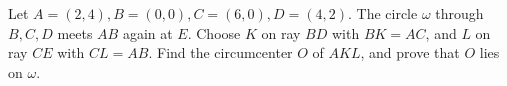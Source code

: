 Let $A=(2,4),B=(0,0),C=(6,0),D=(4,2)$. The circle $\omega$ through $B,C,D$ meets $AB$ again at $E$. Choose $K$ on ray $BD$ with $BK=AC$, and $L$ on ray $CE$ with $CL=AB$. Find the circumcenter $O$ of $AKL$, and prove that $O$ lies on $\omega$.
